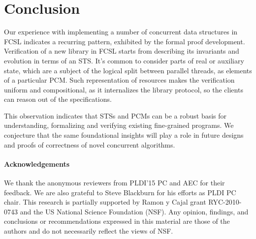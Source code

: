 \vspace{-5pt}

\section{Conclusion}
\label{sec:conclusion}

Our experience with implementing a number of concurrent data
structures in FCSL indicates a recurring pattern, exhibited by the
formal proof development.
%
Verification of a new library in FCSL starts from describing its
invariants and evolution in terms of an STS. It's common to consider
parts of real or auxiliary state, which are a subject of the logical
split between parallel threads, as elements of a particular PCM.
%
Such representation of resources makes the verification uniform
and compositional, as it internalizes the library protocol, so the
clients can reason out of the specifications.

This observation indicates that STSs and PCMs can be a robust basis
for understanding, formalizing and verifying existing fine-grained
programs. We conjecture that the same foundational insights will play
a role in future designs and proofs of correctness of novel concurrent
algorithms.

\paragraph{Acknowledgements}

We thank the anonymous reviewers from PLDI'15 PC and AEC for their
feedback. We are also grateful to Steve Blackburn for his efforts as
PLDI PC chair. This research is partially supported by Ramon y Cajal
grant RYC-2010-0743 and the US National Science Foundation (NSF). Any
opinion, findings, and conclusions or recommendations expressed in
this material are those of the authors and do not necessarily reflect
the views of NSF.

\vspace{-5pt}
